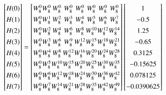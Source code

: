 \documentclass[journal,12pt,twocolumn]{IEEEtran}
\renewcommand\thesection{\arabic{section}}
\begin{document}
\begin{enumerate}[label=\thesection.\arabic*.,ref=\thesection.\theenumi]
\begin{equation}
\renewcommand{\arraystretch}{1.35}
\setlength\arraycolsep{0.05pt}
\begin{bmatrix}
H(0) \\
H(1) \\
H(2) \\
H(3) \\
H(4) \\
H(5) \\
H(6) \\
H(7)
\end{bmatrix}
=
\begin{bmatrix}
W^{0}_{8} & W^{0}_{8} & W^{0}_{8} & W^{0}_{8} & W^{0}_{8} & W^{0}_{8} & W^{0}_{8} & W^{0}_{8}\\
W^{0}_{8} & W^{1}_{8} & W^{2}_{8} & W^{3}_{8} & W^{4}_{8} & W^{5}_{8} & W^{6}_{8} & W^{7}_{8}\\
W^{0}_{8} & W^{2}_{8} & W^{4}_{8} & W^{6}_{8} & W^{8}_{8} & W^{10}_{8} & W^{12}_{8} & W^{14}_{8}\\
W^{0}_{8} & W^{3}_{8} & W^{6}_{8} & W^{9}_{8} & W^{12}_{8} & W^{15}_{8} & W^{18}_{8} & W^{21}_{8}\\
W^{0}_{8} & W^{4}_{8} & W^{8}_{8} & W^{12}_{8} & W^{16}_{8} & W^{20}_{8} & W^{24}_{8} & W^{28}_{8}\\
W^{0}_{8} & W^{5}_{8} & W^{10}_{8} & W^{15}_{8} & W^{20}_{8} & W^{25}_{8} & W^{30}_{8} & W^{35}_{8}\\
W^{0}_{8} & W^{6}_{8} & W^{12}_{8} & W^{18}_{8} & W^{24}_{8} & W^{30}_{8} & W^{36}_{8} & W^{42}_{8}\\
W^{0}_{8} & W^{7}_{8} & W^{14}_{8} & W^{21}_{8} & W^{28}_{8} & W^{35}_{8} & W^{42}_{8} & W^{49}_{8}
\end{bmatrix}
\begin{bmatrix}
1 \\
-0.5 \\
1.25 \\
-0.65 \\
0.3125 \\
-0.15625 \\
0.078125 \\
-0.0390625
\end{bmatrix}
\end{equation}


\end{enumerate}
\end{document}
